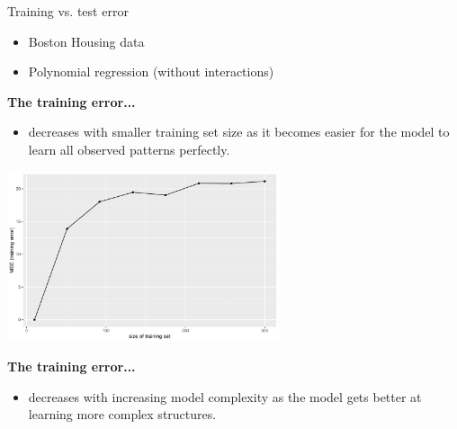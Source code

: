 \begin{vbframe}{Training vs. test error}
\begin{small}
\begin{itemize}
\item Boston Housing data
\item Polynomial regression (without interactions)
\end{itemize}




\textbf{The training error...}
\begin{itemize}
  \item decreases with smaller training set size as it becomes easier for the 
  model to learn all observed patterns perfectly.
\end{itemize}
\end{small}
\begin{center}
\includegraphics[width=0.6\textwidth]{figure/fig-train-vs-test-error-1}
\end{center}

\framebreak

\textbf{The training error...}
\begin{itemize}  
  \item decreases with increasing model complexity as the model gets better at
  learning more complex structures. 
\end{itemize}


\end{vbframe}
